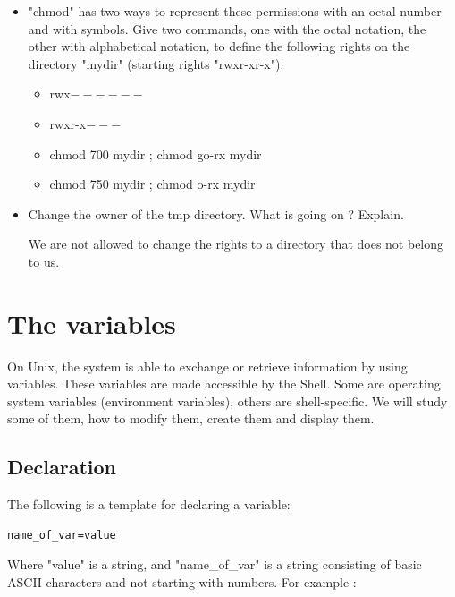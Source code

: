 \documentclass[11pt]{article}
\begin{document}
\begin{itemize}
\begin{solution}
	\end{solution}
	\item "chmod" has two ways to represent these permissions with an octal number and with symbols. Give two commands, one with the octal notation, the other with alphabetical notation, to define the following rights on the directory "mydir" (starting rights "rwxr-xr-x"):
	\begin{itemize}
		\item rwx$------$
		\item rwxr-x$---$
	\end{itemize}
	\begin{solution}
		\begin{itemize}
			\item chmod 700 mydir ; chmod go-rx mydir
			\item chmod 750 mydir ; chmod o-rx mydir
		\end{itemize}
	\end{solution}
	\item Change the owner of the tmp directory. What is going on ? Explain.
	\begin{solution}
		We are not allowed to change the rights to a directory that does not belong to us.
	\end{solution}
\end{itemize}

\section{The variables}
On Unix, the system is able to exchange or retrieve information by using variables. These variables are made accessible by the Shell. Some are operating system variables (environment variables), others are shell-specific.
We will study some of them, how to modify them, create them and display them.

\subsection{Declaration}

The following is a template for declaring a variable:

\begin{lstlisting}
name_of_var=value
\end{lstlisting}

Where "value" is a string, and "name\_of\_var" is a string consisting of basic ASCII characters and not starting with numbers. For example :
\end{document}

